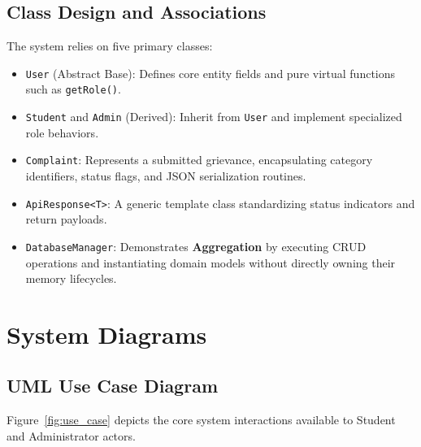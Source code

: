 \documentclass[12pt,a4paper,oneside]{book}
\begin{document}
\subsection{Class Design and Associations}
The system relies on five primary classes:
\begin{itemize}
    \item \texttt{User} (Abstract Base): Defines core entity fields and pure virtual functions such as \texttt{getRole()}.
    \item \texttt{Student} and \texttt{Admin} (Derived): Inherit from \texttt{User} and implement specialized role behaviors.
    \item \texttt{Complaint}: Represents a submitted grievance, encapsulating category identifiers, status flags, and JSON serialization routines.
    \item \texttt{ApiResponse<T>}: A generic template class standardizing status indicators and return payloads.
    \item \texttt{DatabaseManager}: Demonstrates \textbf{Aggregation} by executing CRUD operations and instantiating domain models without directly owning their memory lifecycles.
\end{itemize}

\section{System Diagrams}

\subsection{UML Use Case Diagram}
Figure~\ref{fig:use_case} depicts the core system interactions available to Student and Administrator actors.
\end{document}

